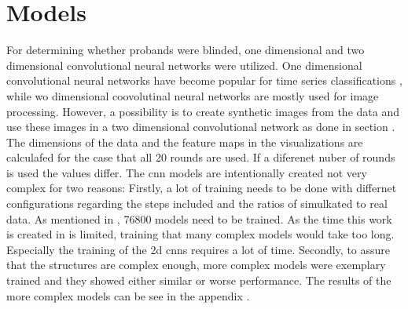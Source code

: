 
\section{Models}
For determining whether probands were blinded, one dimensional and two dimensional convolutional neural networks were utilized. One dimensional convolutional neural networks have become popular for time series classifications , while wo dimensional coovolutinal neural networks are mostly used for image processing. However, a possibility is to create synthetic images from the data and use these images in a two dimensional convolutional network as done in section . The dimensions of the data and the feature maps in the visualizations are calculafed for the case that all 20 rounds are used. If a diferenet nuber of rounds is used the values differ. The cnn models are intentionally created not very complex for two reasons: Firstly, a lot of training needs to be done with differnet configurations regarding the steps included and the ratios of simulkated to real data. As mentioned in , 76800 models need to be trained. As the time this work is created in is limited, training that many complex models would take too long. Especially the training of the 2d cnns requires a lot of time. Secondly, to assure that the structures are complex enough, more complex models were exemplary trained and they showed either similar or worse performance. The results of the more complex models can be see in the appendix . 


